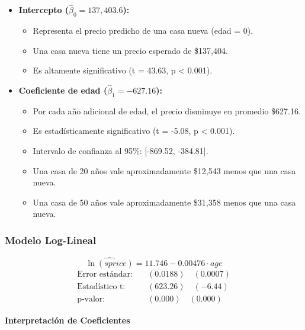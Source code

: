 \documentclass[12pt]{article}
\begin{document}
\begin{itemize}
    \item \textbf{Intercepto ($\hat{\beta}_0 = 137,403.6$):}
    \begin{itemize}
        \item Representa el precio predicho de una casa nueva (edad = 0).
        \item Una casa nueva tiene un precio esperado de \$137,404.
        \item Es altamente significativo (t = 43.63, p < 0.001).
    \end{itemize}
    
    \item \textbf{Coeficiente de edad ($\hat{\beta}_1 = -627.16$):}
    \begin{itemize}
        \item Por cada año adicional de edad, el precio disminuye en promedio \$627.16.
        \item Es estadísticamente significativo (t = -5.08, p < 0.001).
        \item Intervalo de confianza al 95\%: [-869.52, -384.81].
        \item Una casa de 20 años vale aproximadamente \$12,543 menos que una casa nueva.
        \item Una casa de 50 años vale aproximadamente \$31,358 menos que una casa nueva.
    \end{itemize}
\end{itemize}

\subsubsection*{Modelo Log-Lineal}

\[
\widehat{\ln(sprice)} = 11.746 - 0.00476 \cdot age
\]
\begin{align}
\text{Error estándar:} \quad & (0.0188) \quad (0.0007) \\
\text{Estadístico t:} \quad & (623.26) \quad (-6.44) \\
\text{p-valor:} \quad & (0.000) \quad (0.000)
\end{align}

\textbf*{Interpretación de Coeficientes}
\end{document}

